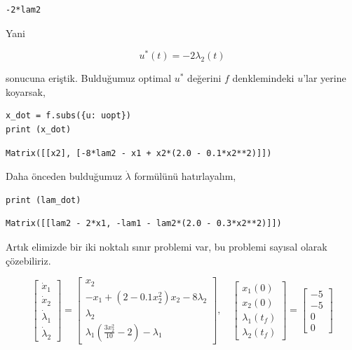 \documentclass[12pt,fleqn]{article}\usepackage{../../common}
\begin{document}
\begin{verbatim}
-2*lam2
\end{verbatim}

Yani

$$
u^\ast(t) = -2 \lambda_2(t)
$$

sonucuna eriştik. Bulduğumuz optimal $u^\ast$ değerini $f$ denklemindeki
$u$'lar yerine koyarsak,

\begin{verbatim}
x_dot = f.subs({u: uopt})
print (x_dot)
\end{verbatim}

\begin{verbatim}
Matrix([[x2], [-8*lam2 - x1 + x2*(2.0 - 0.1*x2**2)]])
\end{verbatim}

Daha önceden bulduğumuz $\dot{\lambda}$ formülünü hatırlayalım,

\begin{verbatim}
print (lam_dot)
\end{verbatim}

\begin{verbatim}
Matrix([[lam2 - 2*x1, -lam1 - lam2*(2.0 - 0.3*x2**2)]])
\end{verbatim}

Artık elimizde bir iki noktalı sınır problemi var, bu problemi sayısal
olarak çözebiliriz. 

$$
\left[\begin{array}{c}
\dot{x}_1 \\ 
\dot{x}_2 \\ 
\dot{\lambda}_1 \\ 
\dot{\lambda}_2 
\end{array}\right] = 
\left[\begin{array}{c}
x_2 \\ 
-x_1 + (2 - 0.1 x_2^2 ) x_2 - 8 \lambda_2 \\
\lambda_2 \\
\lambda_1 \left( \frac{3x_2^2}{10} - 2  \right) - \lambda_1
\end{array}\right], 
\quad
\left[\begin{array}{c}
x_1(0) \\ x_2(0) \\ \lambda_1(t_f) \\ \lambda_2(t_f)
\end{array}\right] = 
\left[\begin{array}{c}
-5 \\ -5 \\ 0 \\ 0
\end{array}\right]
$$
\end{document}

